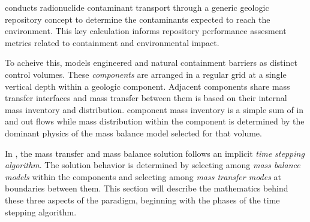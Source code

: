 \Cyder conducts radionuclide contaminant transport through a generic geologic 
repository concept to determine the 
contaminants expected to reach the environment. This key calculation 
informs repository performance assesment metrics related to containment and 
environmental impact.

To acheive this, \Cyder models engineered and natural containment barriers as 
distinct control volumes. These \emph{components} are arranged in a regular 
grid at a single vertical depth within a geologic component. Adjacent 
components share mass transfer interfaces and mass transfer between them is 
based on their internal mass inventory and distribution. component mass 
inventory is a simple sum of in and out flows while mass distribution within 
the component is determined by the dominant physics of the mass balance model 
selected for that volume.

In \Cyder, the mass transfer and mass balance solution follows an implicit 
\emph{time stepping algorithm}. The solution behavior is determined by selecting 
among \emph{mass balance models} within the components and selecting 
among \emph{mass transfer modes} at boundaries between them. This section will describe 
the mathematics behind these three aspects of the \Cyder paradigm, beginning 
with the phases of the time stepping algorithm.

